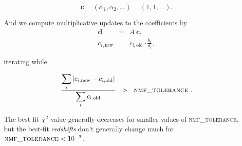 \documentclass[11pt]{article}
\begin{document}
\begin{equation}
\mathbf{c} = \left(\alpha_1, \alpha_2, \ldots\right) = \left(1, 1, \ldots\right).
\end{equation}

And we compute multiplicative updates to the coefficients by
\begin{eqnarray}
\mathbf{d} & = & A\ \mathbf{c}, \\
c_{i,\mathrm{new}} & = & c_{i,\mathrm{old}} \cdot \frac{b_i}{d_i}, 
\end{eqnarray}

\noindent iterating while 

\begin{equation}
\frac{\displaystyle\sum_i \left| c_{i,\mathrm{new}} - c_{i,\mathrm{old}} \right| }
 {\displaystyle\sum_i c_{i,\mathrm{old}}}\ \  > \ \ \textsc{nmf\_tolerance}\ .
\end{equation}

The best-fit $\chi^2$ value generally decreases for smaller values of
\textsc{nmf\_tolerance}, but the best-fit \textit{redshifts} don't generally
change much for $\textsc{nmf\_tolerance} <  10^{-3}$.

\end{document}
